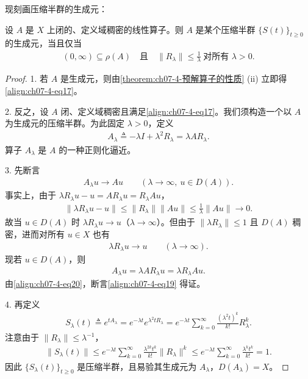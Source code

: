 \documentclass[../../main.tex]{subfiles}
\begin{document}
现刻画压缩半群的生成元：

\begin{theorem}\label{theorem:ch07-4-Hille-Yosida}设 $A$ 是 $X$ 上闭的、定义域稠密的线性算子。则 $A$ 是某个压缩半群 $\{S(t)\}_{t\geqslant 0}$ 的生成元，当且仅当
\begin{align}
(0,\infty)\subseteq\rho(A)\quad\text{且}\quad \|R_\lambda\|\leqslant\frac{1}{\lambda}\ \text{对所有 }\lambda>0.\label{align:ch07-4-eq17}
\end{align}
\end{theorem}

\begin{proof}
1. 若 $A$ 是生成元，则由\cref{theorem:ch07-4-预解算子的性质} (ii) 立即得\eqref{align:ch07-4-eq17}。

2. 反之，设 $A$ 闭、定义域稠密且满足\eqref{align:ch07-4-eq17}。我们须构造一个以 $A$ 为生成元的压缩半群。为此固定 $\lambda>0$，定义
\begin{align}
A_\lambda\triangleq -\lambda I+\lambda^2 R_\lambda=\lambda AR_\lambda.\label{align:ch07-4-eq18}
\end{align}
算子 $A_\lambda$ 是 $A$ 的一种正则化逼近。

3. 先断言
\begin{align}
A_\lambda u\to Au\qquad (\lambda\to\infty,\ u\in D(A)).\label{align:ch07-4-eq19}
\end{align}
事实上，由于 $\lambda R_\lambda u-u=AR_\lambda u=R_\lambda Au$，
\begin{align*}
\|\lambda R_\lambda u-u\|\leqslant\|R_\lambda\|\|Au\|\leqslant\frac{1}{\lambda}\|Au\|\to 0.
\end{align*}
故当 $u\in D(A)$ 时 $\lambda R_\lambda u\to u$（$\lambda\to\infty$）。但由于 $\|\lambda R_\lambda\|\leqslant 1$ 且 $D(A)$ 稠密，进而对所有 $u\in X$ 也有
\begin{align}
\lambda R_\lambda u\to u\qquad (\lambda\to\infty).\label{align:ch07-4-eq20}
\end{align}
现若 $u\in D(A)$，则
\begin{align*}
A_\lambda u=\lambda AR_\lambda u=\lambda R_\lambda Au.
\end{align*}
由\eqref{align:ch07-4-eq20}，断言\eqref{align:ch07-4-eq19} 得证。

4. 再定义
\begin{align*}
S_\lambda(t)\triangleq e^{tA_\lambda}=e^{-\lambda t}e^{\lambda^2 tR_\lambda}=e^{-\lambda t}\sum_{k=0}^\infty\frac{(\lambda^2 t)^k}{k!}R_\lambda^k.
\end{align*}
注意由于 $\|R_\lambda\|\leqslant\lambda^{-1}$，
\begin{align*}
\|S_\lambda(t)\|\leqslant e^{-\lambda t}\sum_{k=0}^\infty\frac{\lambda^{2k}t^k}{k!}\|R_\lambda\|^k
\leqslant e^{-\lambda t}\sum_{k=0}^\infty\frac{\lambda^k t^k}{k!}=1.
\end{align*}
因此 $\{S_\lambda(t)\}_{t\geqslant 0}$ 是压缩半群，且易验其生成元为 $A_\lambda$，$D(A_\lambda)=X$。


\end{proof}
\end{document}

